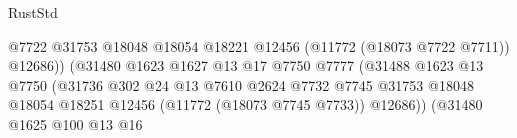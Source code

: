 \begin{lexlean}{RustStd}
\begin{coremodule}
                                                            @7722
                                                            @31753
                                                            @18048
                                                            @18054
                                                            @18221
                                                            @12456
                                                            (@11772 (@18073 @7722 @7711))
                                                            @12686))
                                                        (@31480
                                                          @1623
                                                          @1627
                                                          @13
                                                          @17
                                                          @7750
                                                          @7777
                                                          (@31488
                                                            @1623
                                                            @13
                                                            @7750
                                                            (@31736
                                                              @302
                                                              @24
                                                              @13
                                                              @7610
                                                              @2624
                                                              @7732
                                                              @7745
                                                              @31753
                                                              @18048
                                                              @18054
                                                              @18251
                                                              @12456
                                                              (@11772 (@18073 @7745 @7733))
                                                              @12686))
                                                          (@31480
                                                            @1625
                                                            @100
                                                            @13
                                                            @16

\end{coremodule}
\end{lexlean}
